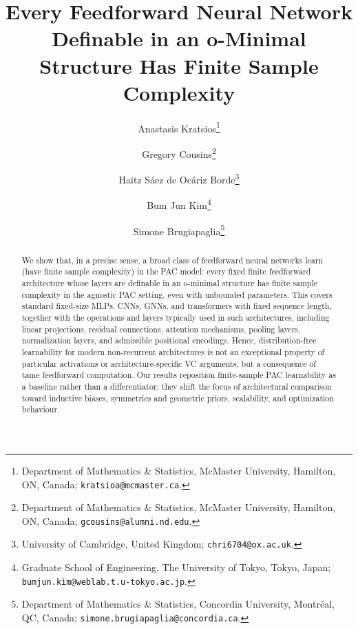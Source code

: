 \documentclass{article}
\theoremstyle{plain}
\theoremstyle{definition}
\theoremstyle{remark}
\theoremstyle{plain}
\numberwithin{thm}{section}
\theoremstyle{definition}
\numberwithin{equation}{section}
\begin{document}
\title{Every Feedforward Neural Network Definable in an o-Minimal Structure Has Finite Sample Complexity}


\author{%
  Anastasis Kratsios\thanks{Department of Mathematics \& Statistics, McMaster University, Hamilton, ON, Canada; \texttt{kratsioa@mcmaster.ca}.}
  \and
  Gregory Cousins\thanks{Department of Mathematics \& Statistics, McMaster University, Hamilton, ON, Canada; \texttt{gcousins@alumni.nd.edu}.}
  \and
  Haitz S\'aez de Oc\'ariz Borde\thanks{University of Cambridge, United Kingdom; \texttt{chri6704@ox.ac.uk}.}
  \qquad\qquad
  \and 
  Bum Jun Kim\thanks{Graduate School of Engineering, The University of Tokyo, Tokyo, Japan; \texttt{bumjun.kim@weblab.t.u-tokyo.ac.jp}.}
  \and
  Simone Brugiapaglia\thanks{Department of Mathematics \& Statistics, Concordia University, Montr\'eal, QC, Canada; \texttt{simone.brugiapaglia@concordia.ca}.}
}

\maketitle

\begin{abstract}
We show that, in a precise sense, a broad class of feedforward neural networks learn (have finite sample complexity) in the PAC model: every fixed finite feedforward architecture whose layers are definable in an o-minimal structure has finite sample complexity in the agnostic PAC setting, even with unbounded parameters. This covers standard fixed-size MLPs, CNNs, GNNs, and transformers with fixed sequence length, together with the operations and layers typically used in such architectures, including linear projections, residual connections, attention mechanisms, pooling layers, normalization layers, and admissible positional encodings. Hence, distribution-free learnability for modern non-recurrent architectures is not an exceptional property of particular activations or architecture-specific VC arguments, but a consequence of tame feedforward computation. Our results reposition finite-sample PAC learnability as a baseline rather than a differentiator: they shift the focus of architectural comparison toward inductive biases, symmetries and geometric priors, scalability, and optimization behaviour.
\end{abstract}


\end{document}
